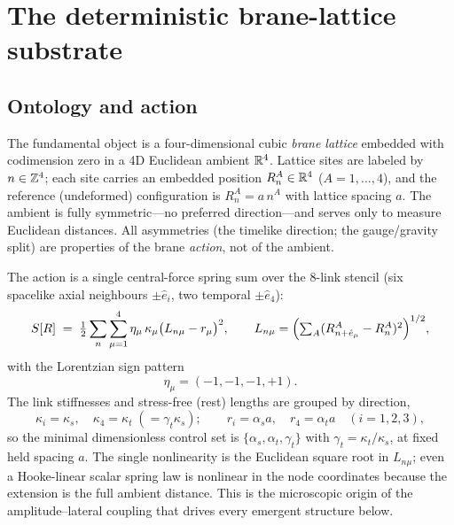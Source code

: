 \section{The deterministic brane-lattice substrate}
\label{sec:substrate}

\subsection{Ontology and action}
\label{subsec:ontology}

The fundamental object is a four-dimensional cubic \emph{brane lattice} embedded with
codimension zero in a 4D Euclidean ambient $\mathbb{R}^4$. Lattice sites are labeled by
$n\in\mathbb{Z}^4$; each site carries an embedded position $R_n^A\in\mathbb{R}^4$ ($A=1,\dots,4$), and
the reference (undeformed) configuration is $R_n^A=a\,n^A$ with lattice spacing $a$. The
ambient is fully symmetric---no preferred direction---and serves only to measure Euclidean
distances. All asymmetries (the timelike direction; the gauge/gravity split) are
properties of the brane \emph{action}, not of the ambient.

The action is a single central-force spring sum over the $8$-link stencil (six spacelike
axial neighbours $\pm\hat{e}_i$, two temporal $\pm\hat{e}_4$):
\begin{equation}
  S[R] \;=\; \tfrac12 \sum_{n}\sum_{\mu=1}^{4}
      \eta_\mu\,\kappa_\mu \bigl(L_{n\mu}-r_\mu\bigr)^2,
  \qquad
  L_{n\mu}=\Bigl(\textstyle\sum_A (R_{n+\hat e_\mu}^A-R_n^A)^2\Bigr)^{1/2},
  \label{eq:action}
\end{equation}
with the Lorentzian sign pattern
\begin{equation}
  \eta_\mu=(-1,-1,-1,+1).
  \label{eq:eta}
\end{equation}
The link stiffnesses and stress-free (rest) lengths are grouped by direction,
\begin{equation}
  \kappa_i=\kappa_s,\quad \kappa_4=\kappa_t\;(=\gamma_t\kappa_s);\qquad
  r_i=\alpha_s a,\quad r_4=\alpha_t a \quad(i=1,2,3),
  \label{eq:params}
\end{equation}
so the minimal dimensionless control set is $\{\alpha_s,\alpha_t,\gamma_t\}$ with
$\gamma_t=\kappa_t/\kappa_s$, at fixed held spacing $a$. The single nonlinearity is the
Euclidean square root in $L_{n\mu}$; even a Hooke-linear scalar spring law is nonlinear in
the node coordinates because the extension is the full ambient distance. This is the
microscopic origin of the amplitude--lateral coupling that drives every emergent structure
below.

